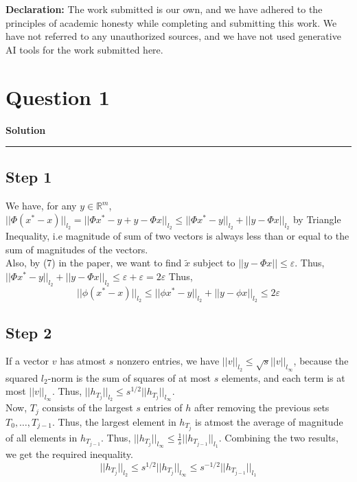 \documentclass[a4paper,12pt]{article}
\title{\cooltitle{CS754 Assignment-2}}
\author{{\bf Saksham Rathi, Ekansh Ravi Shankar, Kshitij Vaidya}}
\date{}
\newenvironment{solution}[2][]{%
    \begin{mdframed}[linecolor=blue!70!black, linewidth=2pt, roundcorner=10pt, backgroundcolor=yellow!10!white, skipabove=12pt, skipbelow=12pt]%
        \textbf{\large #2}
        \par\noindent\rule{\textwidth}{0.4pt}
}{
    \end{mdframed}
}
\begin{document}
\maketitle
\textbf{Declaration:} The work submitted is our own, and
we have adhered to the principles of academic honesty while completing and submitting this work. We have not referred to any unauthorized sources, and we have not used generative AI tools for the work submitted here.

\section*{Question 1}

\begin{solution}{Solution}
\vspace{-25pt}
\subsection*{Step 1}
We have, for any $y \in \mathbb{R}^m$, $||\Phi(x^*-x)||_{l_2} = ||\Phi x^*-y+y-\Phi x||_{l_2} \leq ||\Phi x^* - y||_{l_2} + ||y - \Phi x||_{l_2}$ by Triangle Inequality, i.e magnitude of sum of two vectors is always less than or equal to the sum of magnitudes of the vectors. \\
Also, by (7) in the paper, we want to find $\tilde{x}$ subject to $||y-\Phi x|| \leq \varepsilon$. Thus, $||\Phi x^* - y||_{l_2} + ||y - \Phi x||_{l_2} \leq \varepsilon + \varepsilon = 2\varepsilon$
Thus,
\[
||\phi(x^*-x)||_{l_2} \leq ||\phi x^* - y||_{l_2} + ||y - \phi x||_{l_2} \leq 2\varepsilon
\]

\subsection*{Step 2}

If a vector $v$ has atmost $s$ nonzero entries, we have $||v||_{l_2} \leq \sqrt{s}||v||_{l_\infty}$, because the squared $l_2$-norm is the sum of squares of at most $s$ elements, and each term is at most $||v||_{l_\infty}$. Thus, $||h_{T_j}||_{l_2} \leq s^{1/2}||h_{T_j}||_{l_\infty}$.\\
Now, $T_j$ consists of the largest $s$ entries of $h$ after removing the previous sets $T_0, \dots, T_{j-1}$. Thus, the largest element in $h_{T_j}$ is atmost the average of magnitude of all elements in $h_{T_{j-1}}$. Thus, $||h_{T_j}||_{l_\infty} \leq \frac{1}{s}||h_{T_{j-1}}||_{l_1}$. Combining the two results, we get the required inequality.
\[
||h_{T_j}||_{l_2} \leq s^{1/2}||h_{T_j}||_{l_\infty} \leq s^{-1/2}||h_{T_{j-1}}||_{l_1}
\]


\end{solution}
\end{document}
